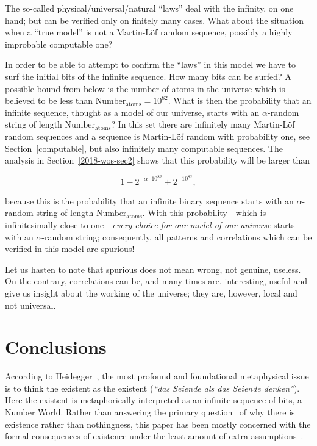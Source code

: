 \documentclass[12pt]{article}
\begin{document}
The so-called  physical/universal/natural ``laws'' deal with the infinity, on one hand;
but can be verified only on finitely many cases. What about the situation when a
``true model'' is not a Martin-L\"of random sequence, possibly a highly improbable computable one?

In order to be able to attempt to confirm the ``laws''  in this model we have to surf
the initial bits of the infinite sequence.
How many bits can be surfed?
A possible bound  from below is the number of atoms in the universe which is believed to be less than
$\text{Number}_\text{atoms}=10^{82}$. What is then the probability that
an infinite sequence, thought as a model of our universe, starts
with an $\alpha$-random  string of length $\text{Number}_\text{atoms}$?
In this set there are infinitely many Martin-L\"of random sequences
and a sequence is Martin-L\"of random with probability one, see Section~\ref{computable},
but also infinitely many computable sequences.
The analysis in Section~\ref{2018-wos-sec2}
shows that this probability will be larger than

\[1- 2^{- \alpha \cdot 10^{82} }+2^{-10^{82}},\]

\noindent because this is the probability  that an infinite binary sequence starts with an $\alpha$-random string  of length $\text{Number}_\text{atoms}$.
With this probability---which is infinitesimally close to one---{\it every  choice for our  model of our universe } starts with an
$\alpha$-random  string; consequently, all patterns and correlations which can be verified  in this model  are spurious!

Let us hasten to note that spurious does not mean wrong, not  genuine,  useless.
On the contrary, correlations can be, and many times are,   interesting, useful and give us insight about the working of the universe; they are,
however,  local and not universal.




\section{Conclusions}
\label{2018-was-secsum}
According to Heidegger~\cite{Heidegger-1929},
the most profound and foundational
metaphysical issue is to think the existent as the existent
({\em ``das Seiende als das Seiende denken''}).
Here the existent is metaphorically interpreted as
an infinite sequence of bits, a Number World.
Rather than answering the primary question~\cite{Heidegger-1935} of why there
is existence rather than nothingness,
this paper has  been mostly concerned with the formal consequences of existence under
the least amount of extra assumptions~\cite{jaynes}.
\end{document}
